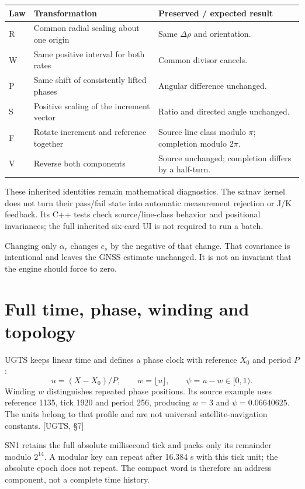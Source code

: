 \documentclass[11pt,a4paper]{article}
\newcommand{\uRef}[1]{\textcolor{muted}{[UGTS, #1]}}
\begin{document}
\par\small
\begin{tabularx}{\textwidth}{@{}P{.08\textwidth}P{.37\textwidth}Y@{}}\toprule
\textbf{Law} & \textbf{Transformation} & \textbf{Preserved / expected result}\\\midrule
R & Common radial scaling about one origin & Same $\Delta\rho$ and orientation.\\
W & Same positive interval for both rates & Common divisor cancels.\\
P & Same shift of consistently lifted phases & Angular difference unchanged.\\
S & Positive scaling of the increment vector & Ratio and directed angle unchanged.\\
F & Rotate increment and reference together & Source line class modulo $\pi$; completion modulo $2\pi$.\\
V & Reverse both components & Source unchanged; completion differs by a half-turn.\\\bottomrule
\end{tabularx}
\par\normalsize

These inherited identities remain mathematical diagnostics. The satnav kernel does not turn their pass/fail
state into automatic measurement rejection or J/K feedback. Its C++ tests check source/line-class behavior
and positional invariances; the full inherited six-card UI is not required to run a batch.

Changing only $\alpha_r$ changes $e_s$ by the negative of that change. That covariance is intentional and
leaves the GNSS estimate unchanged. It is not an invariant that the engine should force to zero.
\clearpage

\section{Full time, phase, winding and topology}
UGTS keeps linear time and defines a phase clock with reference $X_0$ and period $P$:
\begin{equation}
u=(X-X_0)/P,\qquad w=\lfloor u\rfloor,\qquad\psi=u-w\in[0,1).
\end{equation}
Winding $w$ distinguishes repeated phase positions. Its source example uses reference 1135, tick 1920 and
period 256, producing $w=3$ and $\psi=0.06640625$. The units belong to that profile and are not universal
satellite-navigation constants. \uRef{\S7}

SN1 retains the full absolute millisecond tick and packs only its remainder modulo $2^{14}$. A modular
key can repeat after 16.384 s with this tick unit; the absolute epoch does not repeat. The compact word is
therefore an address component, not a complete time history.
\end{document}
